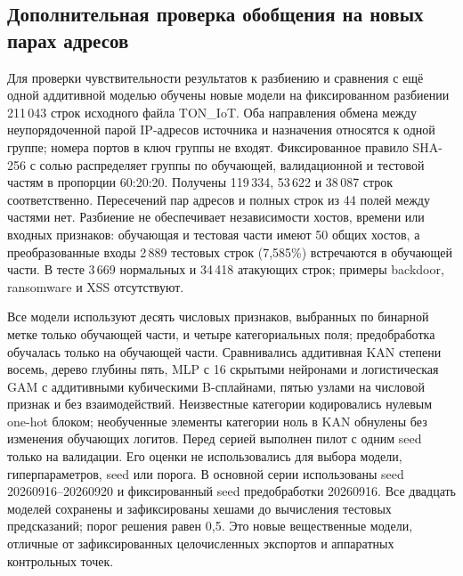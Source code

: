 \subsection{Дополнительная проверка обобщения на новых парах адресов}
\label{sec:pair-stage2}
Для проверки чувствительности результатов к разбиению и сравнения с ещё одной
аддитивной моделью обучены новые модели на фиксированном разбиении 211\,043 строк
исходного файла TON\_IoT. Оба направления обмена между неупорядоченной парой
IP-адресов источника и назначения относятся к одной группе; номера портов в
ключ группы не входят. Фиксированное правило SHA-256 с солью распределяет группы
по обучающей, валидационной и тестовой частям в пропорции 60:20:20. Получены
119\,334, 53\,622 и 38\,087 строк соответственно. Пересечений пар адресов и полных
строк из 44 полей между частями нет. Разбиение не обеспечивает независимости
хостов, времени или входных признаков: обучающая и тестовая части имеют 50 общих
хостов, а преобразованные входы 2\,889 тестовых строк (7{,}585\%) встречаются в
обучающей части. В тесте 3\,669 нормальных и 34\,418 атакующих строк; примеры
backdoor, ransomware и XSS отсутствуют.

Все модели используют десять числовых признаков, выбранных по бинарной метке только обучающей части,
и четыре категориальных поля; предобработка обучалась только на обучающей части.
Сравнивались аддитивная KAN степени восемь, дерево глубины пять, MLP с 16
скрытыми нейронами и логистическая GAM с аддитивными кубическими B-сплайнами,
пятью узлами на числовой признак и без взаимодействий. Неизвестные категории
кодировались нулевым one-hot блоком; необученные элементы категории ноль в KAN
обнулены без изменения обучающих логитов. Перед серией выполнен пилот с одним
seed только на валидации. Его оценки не использовались для выбора модели,
гиперпараметров, seed или порога. В основной серии использованы seed
20260916--20260920 и фиксированный seed предобработки 20260916. Все двадцать
моделей сохранены и зафиксированы хешами до вычисления тестовых предсказаний;
порог решения равен 0{,}5. Это новые вещественные модели, отличные от
зафиксированных целочисленных экспортов и аппаратных контрольных точек.

